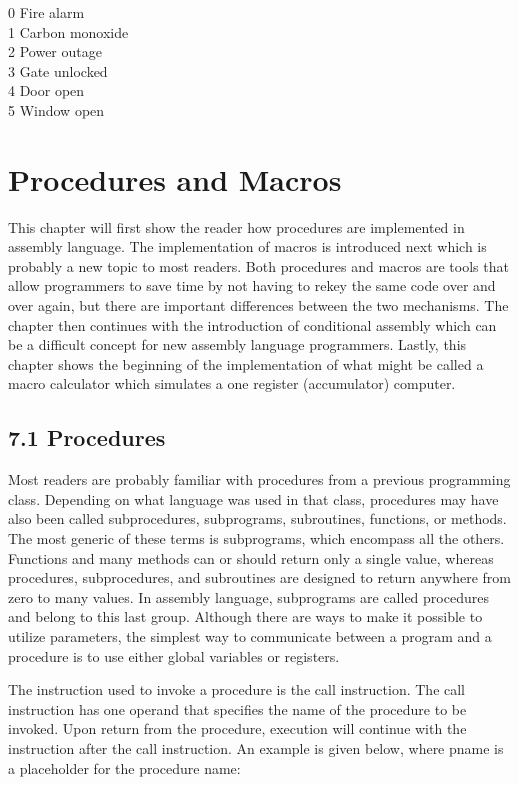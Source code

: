 \documentclass[10pt]{article}
\begin{document}
0 Fire alarm\\
1 Carbon monoxide\\
2 Power outage\\
3 Gate unlocked\\
4 Door open\\
5 Window open

\section*{Procedures and Macros}
This chapter will first show the reader how procedures are implemented in assembly language. The implementation of macros is introduced next which is probably a new topic to most readers. Both procedures and macros are tools that allow programmers to save time by not having to rekey the same code over and over again, but there are important differences between the two mechanisms. The chapter then continues with the introduction of conditional assembly which can be a difficult concept for new assembly language programmers. Lastly, this chapter shows the beginning of the implementation of what might be called a macro calculator which simulates a one register (accumulator) computer.

\subsection*{7.1 Procedures}
Most readers are probably familiar with procedures from a previous programming class. Depending on what language was used in that class, procedures may have also been called subprocedures, subprograms, subroutines, functions, or methods. The most generic of these terms is subprograms, which encompass all the others. Functions and many methods can or should return only a single value, whereas procedures, subprocedures, and subroutines are designed to return anywhere from zero to many values. In assembly language, subprograms are called procedures and belong to this last group. Although there are ways to make it possible to utilize parameters, the simplest way to communicate between a program and a procedure is to use either global variables or registers.

The instruction used to invoke a procedure is the call instruction. The call instruction has one operand that specifies the name of the procedure to be invoked. Upon return from the procedure, execution will continue with the instruction after the call instruction. An example is given below, where pname is a placeholder for the procedure name:
\end{document}
